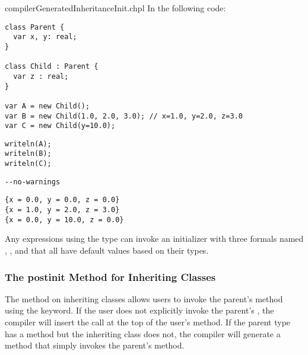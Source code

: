 \begin{chapelexample}{compilerGeneratedInheritanceInit.chpl}
In the following code:
\begin{chapel}
\begin{verbatim}
class Parent {
  var x, y: real;
}

class Child : Parent {
  var z : real;
}

var A = new Child();
var B = new Child(1.0, 2.0, 3.0); // x=1.0, y=2.0, z=3.0
var C = new Child(y=10.0);
\end{verbatim}
\end{chapel}
\begin{chapelpost}
\begin{verbatim}
writeln(A);
writeln(B);
writeln(C);
\end{verbatim}
\end{chapelpost}
\begin{chapelcompopts}
\begin{verbatim}
--no-warnings
\end{verbatim}
\end{chapelcompopts}
\begin{chapeloutput}
\begin{verbatim}
{x = 0.0, y = 0.0, z = 0.0}
{x = 1.0, y = 2.0, z = 3.0}
{x = 0.0, y = 10.0, z = 0.0}
\end{verbatim}
\end{chapeloutput}
Any  expressions using the  type can invoke an
initializer with three formals named , , and  that all
have default values based on their types.
\end{chapelexample}

\subsubsection{The postinit Method for Inheriting Classes}
\label{The_postinit_Method_for_Inheriting_Classes}

The  method on inheriting classes allows users to invoke
the parent's  method using the  keyword. If the
user does not explicitly invoke the parent's , the compiler
will insert the call at the top of the user's  method. If the
parent type has a  method but the inheriting class does not,
the compiler will generate a  method that simply invokes the
parent's  method.

